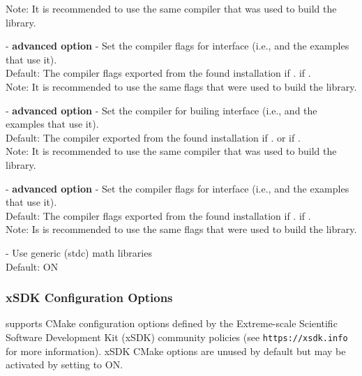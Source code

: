 \begin{description}
  Note: It is recommended to use the same compiler that was used to build the {\trilinos} library.
\item[\id{TRILINOS\_INTERFACE\_C\_COMPILER\_FLAGS}] - \textbf{advanced option} -
  Set the {\CC} compiler flags for {\trilinos} interface
  (i.e., {\nvectrilinos} and the examples that use it).
  \\
  Default: The {\CC} compiler flags exported from the found {\trilinos} installation
  if .  if .
  \\
  Note: It is recommended to use the same flags that were used to build the {\trilinos} library.
\item[\id{TRILINOS\_INTERFACE\_CXX\_COMPILER}] - \textbf{advanced option} -
  Set the {\CPP} compiler for builing {\trilinos} interface
  (i.e., {\nvectrilinos} and the examples that use it).
  \\
  Default: The {\CPP} compiler exported from the found {\trilinos} installation
  if .  or  if .
  \\
  Note: It is recommended to use the same compiler that was used to build the {\trilinos} library.
\item[\id{TRILINOS\_INTERFACE\_CXX\_COMPILER\_FLAGS}] - \textbf{advanced option} -
  Set the {\CPP} compiler flags for {\trilinos} interface
  (i.e., {\nvectrilinos} and the examples that use it).
  \\
  Default: The {\CPP} compiler flags exported from the found {\trilinos} installation
  if .  if .
  \\
  Note: Is is recommended to use the same flags that were used to build the {\trilinos} library.
\item[\id{USE\_GENERIC\_MATH}] -
  Use generic (stdc) math libraries
  \\
  Default: ON



\end{description}

\subsubsection*{xSDK Configuration Options}

{\sundials} supports CMake configuration options defined by the
Extreme-scale Scientific Software Development Kit (xSDK) community
policies (see {\tt https://xsdk.info} for more information). xSDK
CMake options are unused by default but may be activated by setting
 to ON.

